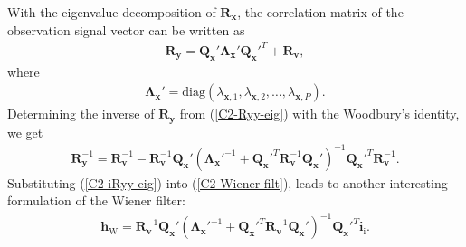 \documentclass[10pt,pdflatex,headrule,landscape]{beamer}
\begin{document}
\begin{frame}


\end{frame}
\begin{frame}[allowframebreaks]

With the eigenvalue decomposition of $\mathbf{R}_{\mathbf{x}}$, the correlation matrix of the observation signal vector can be written as
\begin{eqnarray}
\label{C2-Ryy-eig}
 \mathbf{R}_{\mathbf{y}} = \mathbf{Q}_{\mathbf{x}}' \mathbf{\Lambda}_{\mathbf{x}}' \mathbf{Q}_{\mathbf{x}}'^T + \mathbf{R}_{\mathbf{v}},
\end{eqnarray}
where
\begin{eqnarray}
 \mathbf{\Lambda}_{\mathbf{x}}' = \mathrm{diag} \left( \lambda_{\mathbf{x},1}, \lambda_{\mathbf{x},2}, \ldots, \lambda_{\mathbf{x},P} \right).
\end{eqnarray}
Determining the inverse of $\mathbf{R}_{\mathbf{y}}$ from (\ref{C2-Ryy-eig}) with the Woodbury's identity, we get
\begin{eqnarray}
\label{C2-iRyy-eig}
 \mathbf{R}_{\mathbf{y}}^{-1} = \mathbf{R}_{\mathbf{v}}^{-1} - \mathbf{R}_{\mathbf{v}}^{-1} \mathbf{Q}_{\mathbf{x}}'
 \left( \mathbf{\Lambda}_{\mathbf{x}}'^{-1} + \mathbf{Q}_{\mathbf{x}}'^T \mathbf{R}_{\mathbf{v}}^{-1} \mathbf{Q}_{\mathbf{x}}' \right)^{-1}
 \mathbf{Q}_{\mathbf{x}}'^T \mathbf{R}_{\mathbf{v}}^{-1} .
\end{eqnarray}
Substituting (\ref{C2-iRyy-eig}) into (\ref{C2-Wiener-filt}), leads to another interesting formulation of the Wiener filter:
\begin{eqnarray}
\label{C2-wiener-filt-eig}
 \mathbf{h}_{\mathrm{W}} = \mathbf{R}_{\mathbf{v}}^{-1} \mathbf{Q}_{\mathbf{x}}' \left( \mathbf{\Lambda}_{\mathbf{x}}'^{-1} + \mathbf{Q}_{\mathbf{x}}'^T
 \mathbf{R}_{\mathbf{v}}^{-1} \mathbf{Q}_{\mathbf{x}}' \right)^{-1} \mathbf{Q}_{\mathbf{x}}'^T \mathbf{i}_{\mathrm{i}} .
\end{eqnarray}


\end{frame}
\end{document}
